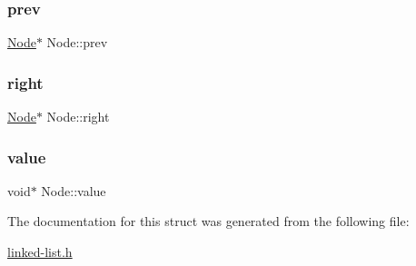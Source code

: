 \subsubsection{\texorpdfstring{prev}{prev}}
{\footnotesize\ttfamily \hyperlink{structNode}{Node}$\ast$ Node\+::prev}

\mbox{\label{structNode_a7328862eaa6dea28018326549b3294d3}} 
\subsubsection{\texorpdfstring{right}{right}}
{\footnotesize\ttfamily \hyperlink{structNode}{Node}$\ast$ Node\+::right}

\mbox{\label{structNode_a520bf86af21ca233eb9f58e9e28c6576}} 
\subsubsection{\texorpdfstring{value}{value}}
{\footnotesize\ttfamily void$\ast$ Node\+::value}



The documentation for this struct was generated from the following file\+:\begin{DoxyCompactItemize}
\item 
\hyperlink{linked-list_8h}{linked-\/list.\+h}\end{DoxyCompactItemize}
